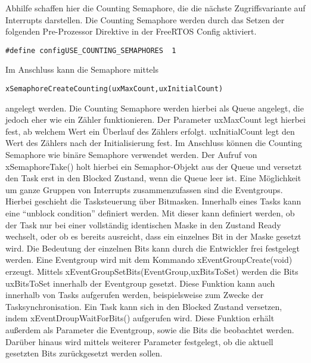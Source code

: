\newline Abhilfe schaffen hier die Counting Semaphore, die die nächste Zugriffsvariante auf Interrupts darstellen. Die Counting Semaphore werden durch das Setzen der folgenden Pre-Prozessor Direktive in der FreeRTOS Config aktiviert.
\begin{lstlisting}[numbers = none]
#define configUSE_COUNTING_SEMAPHORES  1
\end{lstlisting}
Im Anschluss kann die Semaphore mittels
\begin{lstlisting}[numbers = none]
xSemaphoreCreateCounting(uxMaxCount,uxInitialCount) 
\end{lstlisting}
angelegt werden. Die Counting Semaphore werden hierbei als Queue angelegt, die jedoch eher wie ein Zähler funktionieren. Der Parameter uxMaxCount legt hierbei fest, ab welchem Wert ein Überlauf des Zählers erfolgt. uxInitialCount legt den Wert des Zählers nach der Initialisierung fest. Im Anschluss können die Counting Semaphore wie binäre Semaphore verwendet werden. Der Aufruf von xSemaphoreTake() holt hierbei ein Semaphor-Objekt aus der Queue und versetzt den Task erst in den Blocked Zustand, wenn die Queue leer ist.
Eine Möglichkeit um ganze Gruppen von Interrupts zusammenzufassen sind die Eventgroups. Hierbei geschieht die Tasksteuerung über Bitmasken. Innerhalb eines Tasks kann eine "`unblock condition"' definiert werden. Mit dieser kann definiert werden, ob der Task nur bei einer vollständig identischen Maske in den Zustand Ready wechselt, oder ob es bereits ausreicht, dass ein einzelnes Bit in der Maske gesetzt wird. Die Bedeutung der einzelnen Bits kann durch die Entwickler frei festgelegt werden. Eine Eventgroup wird mit dem Kommando xEventGroupCreate(void) erzeugt. Mittels xEventGroupSetBits(EventGroup,uxBitsToSet) werden die Bits uxBitsToSet innerhalb der Eventgroup gesetzt. Diese Funktion kann auch innerhalb von Tasks aufgerufen werden, beispielsweise zum Zwecke der Tasksynchronisation. Ein Task kann sich in den Blocked Zustand versetzen, indem xEventDroupWaitForBits() aufgerufen wird. Diese Funktion erhält außerdem als Parameter die Eventgroup, sowie die Bits die beobachtet werden. Darüber hinaus wird mittels weiterer Parameter festgelegt, ob die aktuell gesetzten Bits zurückgesetzt werden sollen.
